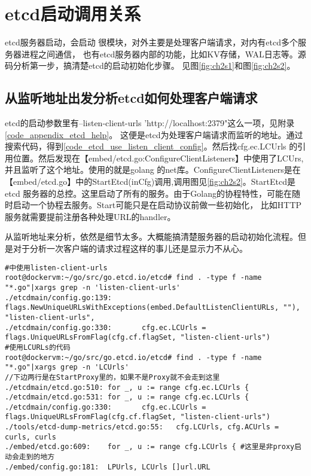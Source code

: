 \section{etcd启动调用关系}
etcd服务器启动，会启动 很模块，对外主要是处理客户端请求，对内有etcd多个服务器进程之间通信，
也有etcd服务器内部的功能，比如KV存储，WAL日志等。源码分析第一步，搞清楚etcd的启动初始化步骤。
见图\ref{fig:ch2s1}和图\ref{fig:ch2s2}。
\subsection{从监听地址出发分析etcd如何处理客户端请求}
etcd的启动参数里有--listen-client-urls 'http://localhost:2379"这么一项，见附录\ref{code_appendix_etcd_help}。
这便是etcd为处理客户端请求而监听的地址。通过搜索代码，得到\ref{code_etcd_use_listen_client_config}。然后找cfg.ec.LCUrls
的引用位置。然后发现在【embed/etcd.go:ConfigureClientListeners】中使用了LCUrs,并且监听了这个地址。使用的就是golang
的net库。ConfigureClientListeners是在【embed/etcd.go】中的StartEtcd(inCfg)调用,调用图见\ref{fig:ch2s2}。StartEtcd是etcd
服务器的总控。这里启动了所有的服务。由于Golang的协程特性，可能在随时启动一个协程去服务。Start可能只是在启动协议前做一些初始化，
比如HTTP服务就需要提前注册各种处理URL的handler。

从监听地址来分析，依然是细节太多。大概能搞清楚服务器的启动初始化流程。但是对于分析一次客户端的请求过程这样的事儿还是显示力不从心。
\label{code_etcd_use_listen_client_config}
\begin{verbatim}
#中使用listen-client-urls
root@dockervm:~/go/src/go.etcd.io/etcd# find . -type f -name "*.go"|xargs grep -n 'listen-client-urls'
./etcdmain/config.go:139:               flags.NewUniqueURLsWithExceptions(embed.DefaultListenClientURLs, ""), "listen-client-urls",
./etcdmain/config.go:330:       cfg.ec.LCUrls = flags.UniqueURLsFromFlag(cfg.cf.flagSet, "listen-client-urls")
#使用LCURLs的代码
root@dockervm:~/go/src/go.etcd.io/etcd# find . -type f -name "*.go"|xargs grep -n 'LCUrls'
//下边两行是在StartProxy里的，如果不是Proxy就不会走到这里
./etcdmain/etcd.go:510: for _, u := range cfg.ec.LCUrls {
./etcdmain/etcd.go:531: for _, u := range cfg.ec.LCUrls {
./etcdmain/config.go:330:       cfg.ec.LCUrls = flags.UniqueURLsFromFlag(cfg.cf.flagSet, "listen-client-urls")
./tools/etcd-dump-metrics/etcd.go:55:   cfg.LCUrls, cfg.ACUrls = curls, curls
./embed/etcd.go:609:    for _, u := range cfg.LCUrls { #这里是非proxy启动会走到的地方
./embed/config.go:181:  LPUrls, LCUrls []url.URL


\end{verbatim}

